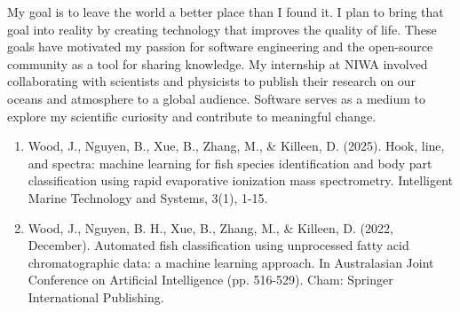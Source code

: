 \documentclass[9pt]{developercv}
\begin{document}
My goal is to leave the world a better place than I found it. I plan to bring that goal into reality by creating technology that improves the quality of life. These goals have motivated my passion for software engineering and the open-source community as a tool for sharing knowledge. My internship at NIWA involved collaborating with scientists and physicists to publish their research on our oceans and atmosphere to a global audience. Software serves as a medium to explore my scientific curiosity and contribute to meaningful change.


\begin{enumerate}
    \item Wood, J., Nguyen, B., Xue, B., Zhang, M., \& Killeen, D. (2025). Hook, line, and spectra: machine learning for fish species identification and body part classification using rapid evaporative ionization mass spectrometry. Intelligent Marine Technology and Systems, 3(1), 1-15.
    \item Wood, J., Nguyen, B. H., Xue, B., Zhang, M., \& Killeen, D. (2022, December). Automated fish classification using unprocessed fatty acid chromatographic data: a machine learning approach. In Australasian Joint Conference on Artificial Intelligence (pp. 516-529). Cham: Springer International Publishing.
\end{enumerate}


\end{document}
